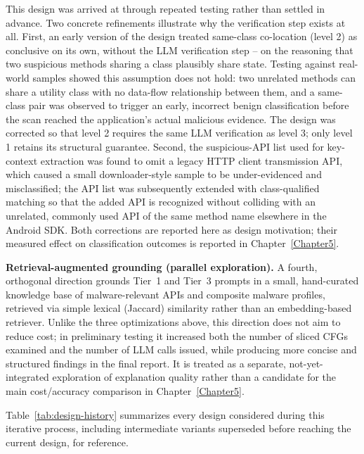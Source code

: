 This design was arrived at through repeated testing rather than settled in
advance. Two concrete refinements illustrate why the verification step
exists at all. First, an early version of the design treated same-class
co-location (level 2) as conclusive on its own, without the LLM verification
step -- on the reasoning that two suspicious methods sharing a class
plausibly share state. Testing against real-world samples showed this
assumption does not hold: two unrelated methods can share a utility class
with no data-flow relationship between them, and a same-class pair was
observed to trigger an early, incorrect benign classification before the
scan reached the application's actual malicious evidence. The design was
corrected so that level 2 requires the same LLM verification as level 3;
only level 1 retains its structural guarantee. Second, the suspicious-API
list used for key-context extraction was found to omit a legacy HTTP client
transmission API, which caused a small downloader-style sample to be
under-evidenced and misclassified; the API list was subsequently extended
with class-qualified matching so that the added API is recognized without
colliding with an unrelated, commonly used API of the same method name
elsewhere in the Android SDK. Both corrections are reported here as design
motivation; their measured effect on classification outcomes is reported in
Chapter~\ref{Chapter5}.

\textbf{Retrieval-augmented grounding (parallel exploration).} A fourth,
orthogonal direction grounds Tier~1 and Tier~3 prompts in a small,
hand-curated knowledge base of malware-relevant APIs and composite malware
profiles, retrieved via simple lexical (Jaccard) similarity rather than an
embedding-based retriever. Unlike the three optimizations above, this
direction does not aim to reduce cost; in preliminary testing it increased
both the number of sliced CFGs examined and the number of LLM calls issued,
while producing more concise and structured findings in the final report.
It is treated as a separate, not-yet-integrated exploration of explanation
quality rather than a candidate for the main cost/accuracy comparison in
Chapter~\ref{Chapter5}.

Table~\ref{tab:design-history} summarizes every design considered during
this iterative process, including intermediate variants superseded before
reaching the current design, for reference.


